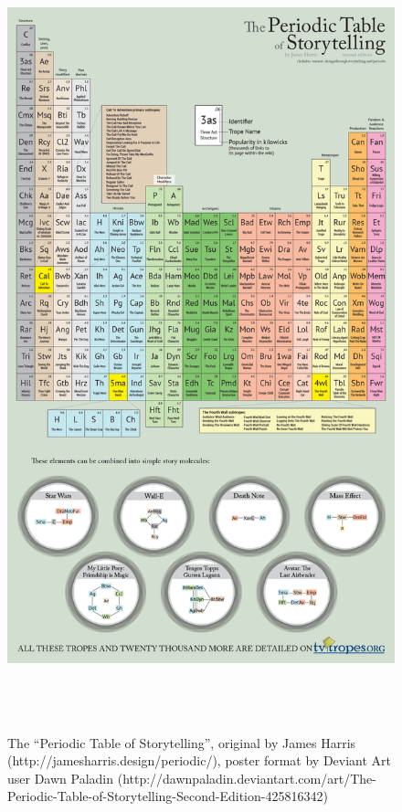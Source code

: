\begin{figure}[!t]
\centerline{\includegraphics[height=9in]{periodicTable.png}}
\caption{The ``Periodic Table of Storytelling'', original by James Harris
  (http://jamesharris.design/periodic/), poster format by Deviant Art user Dawn
  Paladin (http://dawnpaladin.deviantart.com/art/The-Periodic-Table-of-Storytelling-Second-Edition-425816342)} \label{fig:periodic-table}
\end{figure}


